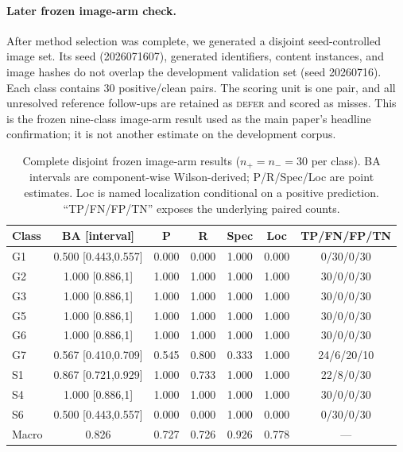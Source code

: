 \documentclass[11pt]{article}
\newcommand{\g}[1]{\textsf{#1}}
\begin{document}
\paragraph{Later frozen image-arm check.}
After method selection was complete, we generated a disjoint seed-controlled
image set. Its seed (2026071607), generated identifiers, content instances, and
image hashes do not overlap the development validation set (seed 20260716).
Each class contains 30 positive/clean pairs. The scoring unit is one pair, and
all unresolved reference follow-ups are retained as \textsc{defer} and scored as
misses. This is the frozen nine-class image-arm result used as the main paper's
headline confirmation; it is not another estimate on the development corpus.

\begin{table}[h]
\centering
\scriptsize
\setlength{\tabcolsep}{3.2pt}
\caption{Complete disjoint frozen image-arm results ($n_+=n_-=30$ per class).
BA intervals are component-wise Wilson-derived; P/R/Spec/Loc are point estimates.
Loc is named localization conditional on a positive prediction. ``TP/FN/FP/TN''
exposes the underlying paired counts.}
\label{tab:frozen-confirmation}
\begin{tabular}{@{}lcccccc@{}}
\toprule
Class & BA [interval] & P & R & Spec & Loc & TP/FN/FP/TN \\
\midrule
\g{G1} & 0.500 [0.443,0.557] & 0.000 & 0.000 & 1.000 & 0.000 & 0/30/0/30 \\
\g{G2} & 1.000 [0.886,1] & 1.000 & 1.000 & 1.000 & 1.000 & 30/0/0/30 \\
\g{G3} & 1.000 [0.886,1] & 1.000 & 1.000 & 1.000 & 1.000 & 30/0/0/30 \\
\g{G5} & 1.000 [0.886,1] & 1.000 & 1.000 & 1.000 & 1.000 & 30/0/0/30 \\
\g{G6} & 1.000 [0.886,1] & 1.000 & 1.000 & 1.000 & 1.000 & 30/0/0/30 \\
\g{G7} & 0.567 [0.410,0.709] & 0.545 & 0.800 & 0.333 & 1.000 & 24/6/20/10 \\
\g{S1} & 0.867 [0.721,0.929] & 1.000 & 0.733 & 1.000 & 1.000 & 22/8/0/30 \\
\g{S4} & 1.000 [0.886,1] & 1.000 & 1.000 & 1.000 & 1.000 & 30/0/0/30 \\
\g{S6} & 0.500 [0.443,0.557] & 0.000 & 0.000 & 1.000 & 0.000 & 0/30/0/30 \\
\midrule
Macro & 0.826 & 0.727 & 0.726 & 0.926 & 0.778 & --- \\
\bottomrule
\end{tabular}
\end{table}
\end{document}
